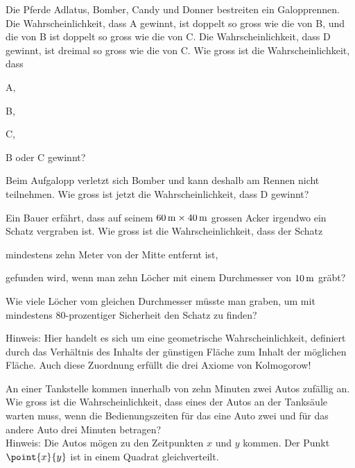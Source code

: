 \documentclass[%
11pt,%
twoside,%
titlepage,%
german,%
headsepline%
]{scrartcl}
\begin{document}
\begin{ueb}[Pferderennen]
Die Pferde Adlatus, Bomber, Candy und Donner bestreiten ein Galopprennen. Die Wahrscheinlichkeit, dass A gewinnt, ist doppelt so gross wie die von B, und die von B ist doppelt so gross wie die von C. Die Wahrscheinlichkeit, dass D gewinnt, ist dreimal so gross wie die von C. Wie gross ist die Wahrscheinlichkeit, dass

\begin{minipage}{3.8cm}
\begin{enumeratea}
\item A,
\item B,
\end{enumeratea}
\end{minipage}
\begin{minipage}{3.9cm}
\begin{enumeratea}
\addtocounter{enumi}{2}
\item C,
\item B oder C gewinnt?
\end{enumeratea}
\end{minipage}

Beim Aufgalopp verletzt sich Bomber und kann deshalb am Rennen nicht teilnehmen. Wie gross
ist jetzt die Wahrscheinlichkeit, dass D gewinnt?
\end{ueb}

\begin{ueb}
Ein Bauer erfährt, dass auf seinem $\unit[60]{m} \times \unit[40]{m}$ grossen Acker irgendwo ein Schatz vergraben ist. Wie gross ist die Wahrscheinlichkeit, dass der Schatz

\begin{enumeratea}
\item mindestens zehn Meter von der Mitte entfernt ist,
\item gefunden wird, wenn man zehn Löcher mit einem
Durchmesser von $\unit[10]{m}$ gräbt?
\item Wie viele Löcher vom gleichen Durchmesser müsste man graben, um mit mindestens $80$-prozentiger Sicherheit den Schatz zu finden?
\end{enumeratea}

Hinweis: Hier handelt es sich um eine geometrische Wahrscheinlichkeit, definiert durch das Verhältnis des Inhalts der günstigen Fläche zum Inhalt der möglichen Fläche. Auch diese Zuordnung erfüllt die drei Axiome von Kolmogorow!
\end{ueb}

\begin{ueb}
An einer Tankstelle kommen innerhalb von zehn Minuten zwei Autos zufällig an. Wie gross ist die Wahrscheinlichkeit, dass eines der Autos an der Tanksäule warten muss, wenn die Bedienungszeiten für das eine Auto zwei und für das andere Auto drei Minuten betragen?\\
Hinweis: Die Autos mögen zu den Zeitpunkten $x$ und $y$ kommen. Der Punkt $\point{x}{y}$ ist in einem Quadrat gleichverteilt.
\end{ueb}
\end{document}
